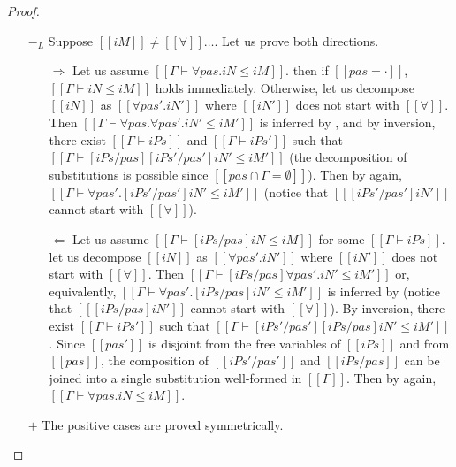 \begin{proof}
\begin{itemize}
\begin{itemize}
      \end{itemize}
    \item [$-_{L}$] Suppose $[[iM]] \neq [[∀]]\dots$. Let us prove both directions.
      \begin{itemize}
        \item [$\Rightarrow$] Let us assume $[[Γ ⊢ ∀pas.iN ≤ iM]]$.
          then if $[[pas = ·]]$, $[[Γ ⊢ iN ≤ iM]]$ holds immediately.
          Otherwise, let us decompose  $[[iN]]$ as $[[∀pas'.iN']]$ where 
          $[[iN']]$ does not start with $[[∀]]$.
          Then $[[Γ ⊢ ∀pas.∀pas'.iN' ≤ iM']]$ is inferred by
          ,
          and by inversion, 
          there exist $[[Γ ⊢ iPs]]$ and $[[Γ ⊢ iPs']]$ 
          such that $[[Γ ⊢ [iPs/pas][iPs'/pas']iN' ≤ iM']]$ 
          (the decomposition of substitutions is possible since $[[{pas} ∩ Γ = ∅]]$).
          Then by  again,
          $[[Γ ⊢ ∀pas'.[iPs'/pas']iN' ≤ iM']]$ (notice that $[[ [iPs'/pas']iN' ]]$ cannot
          start with $[[∀]]$).
        \item [$\Leftarrow$] Let us assume 
          $[[Γ ⊢ [iPs/pas]iN ≤ iM]]$ for some $[[Γ ⊢ iPs]]$.
          let us decompose $[[iN]]$ as $[[∀pas'.iN']]$ where $[[iN']]$ does not start with $[[∀]]$.
          Then $[[Γ ⊢ [iPs/pas]∀pas'.iN' ≤ iM']]$ or, equivalently,
          $[[Γ ⊢ ∀pas'.[iPs/pas]iN' ≤ iM']]$ is inferred by 
          (notice that $[[ [iPs/pas]iN' ]]$ cannot start with $[[∀]]$).
          By inversion, there exist $[[Γ ⊢ iPs']]$ such that 
          $[[Γ ⊢ [iPs'/pas'][iPs/pas]iN' ≤ iM']]$. Since $[[pas']]$ is disjoint
          from the free variables of $[[iPs]]$ and from $[[pas]]$, the composition of 
          $[[iPs'/pas']]$ and $[[iPs/pas]]$ can be joined into a single substitution
          well-formed in $[[Γ]]$. Then by  again,
          $[[Γ ⊢ ∀pas.iN ≤ iM]]$.
      \end{itemize}
      \item [$+$] The positive cases are proved symmetrically.
  \end{itemize}
\end{proof}

